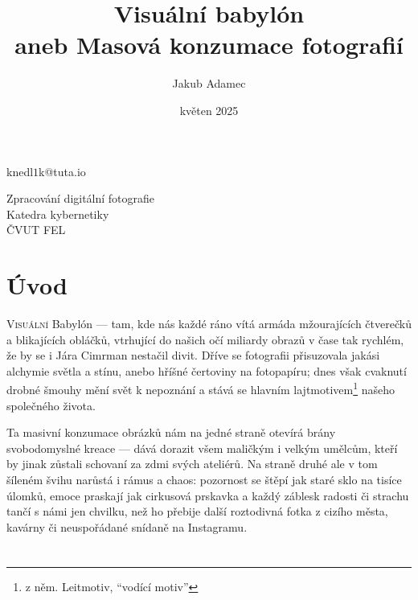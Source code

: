\documentclass[12pt, a4paper]{article} %
\title{%
  Visuální babylón \\
  \large aneb Masová konzumace fotografií}
\author{Jakub Adamec}
\date{květen 2025}
\begin{document}
\makeatletter
\begin{titlepage}
    \centering
    \vspace*{1cm}

    {\Huge\bfseries \textcolor{DarkGray}{\@title} \par}
    \vspace{0.5cm}

    {\Large \@author \par}
    \vspace{0.2cm}

    {knedl$1$k@tuta.io \par}
    \vspace{1.5cm}

    {\large \@date \par}
    \vfill


    \vspace*{1cm}
    {\large Zpracování digitální fotografie \\ Katedra kybernetiky \\ ČVUT FEL\par} %
\end{titlepage}
\makeatother

\pagestyle{fancy}

\section{Úvod}
\lettrine[lines=3, findent=5pt, nindent=0pt]{V}{isuální} Babylón — tam, kde nás každé ráno vítá 
armáda mžourajících čtverečků a blikajících obláčků, vtrhující do našich očí miliardy obrazů v čase tak rychlém, že by 
se i Jára Cimrman nestačil divit. Dříve se fotografii přisuzovala jakási alchymie světla a stínu, anebo 
hříšné čertoviny na fotopapíru; dnes však cvaknutí drobné šmouhy mění svět k nepoznání a stává se hlavním 
lajtmotivem\footnote{z něm. Leitmotiv, \enquote{vodící motiv}} našeho společného života.

Ta masivní konzumace obrázků nám na jedné straně otevírá brány svobodomyslné kreace — dává dorazit všem maličkým i 
velkým umělcům, kteří by jinak zůstali schovaní za zdmi svých ateliérů. Na straně druhé ale v tom šíleném švihu narůstá 
i rámus a chaos: pozornost se štěpí jak staré sklo na tisíce úlomků, emoce praskají jak cirkusová prskavka a každý 
záblesk radosti či strachu tančí s námi jen chvilku, než ho přebije další roztodivná fotka z cizího města, kavárny či 
neuspořádané snídaně na Instagramu.

\section{}
\end{document}
